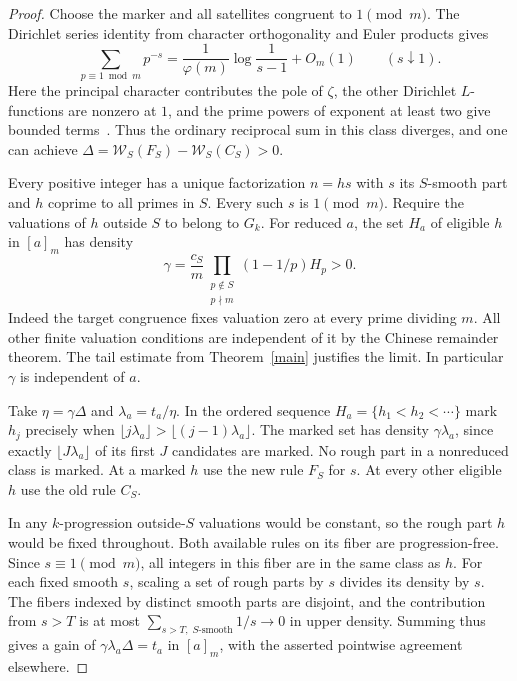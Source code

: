 \documentclass[11pt]{article}
\newcommand{\weight}{\mathcal W}
\begin{document}
\begin{proof}
Choose the marker and all satellites congruent to $1\pmod m$. The Dirichlet series identity from character orthogonality and Euler products gives
\[
 \sum_{p\equiv1\bmod m}p^{-s}
 =\frac1{\varphi(m)}\log\frac1{s-1}+O_m(1)
 \qquad(s\downarrow1).
\]
Here the principal character contributes the pole of $\zeta$, the other Dirichlet $L$-functions are nonzero at $1$, and the prime powers of exponent at least two give bounded terms~\cite{dirichlet}. Thus the ordinary reciprocal sum in this class diverges, and one can achieve $\Delta=\weight_S(F_S)-\weight_S(C_S)>0$.

Every positive integer has a unique factorization $n=hs$ with $s$ its $S$-smooth part and $h$ coprime to all primes in $S$. Every such $s$ is $1\pmod m$. Require the valuations of $h$ outside $S$ to belong to $G_k$. For reduced $a$, the set $H_a$ of eligible $h$ in $[a]_m$ has density
\[
       \gamma=\frac{c_S}{m}
          \prod_{\substack{p\notin S\\ p\nmid m}}(1-1/p)H_p>0.
\]
Indeed the target congruence fixes valuation zero at every prime dividing $m$. All other finite valuation conditions are independent of it by the Chinese remainder theorem. The tail estimate from Theorem~\ref{main} justifies the limit. In particular $\gamma$ is independent of $a$.

Take $\eta=\gamma\Delta$ and $\lambda_a=t_a/\eta$. In the ordered sequence $H_a=\{h_1<h_2<\cdots\}$ mark $h_j$ precisely when $\lfloor j\lambda_a\rfloor>\lfloor(j-1)\lambda_a\rfloor$. The marked set has density $\gamma\lambda_a$, since exactly $\lfloor J\lambda_a\rfloor$ of its first $J$ candidates are marked. No rough part in a nonreduced class is marked. At a marked $h$ use the new rule $F_S$ for $s$. At every other eligible $h$ use the old rule $C_S$.

In any $k$-progression outside-$S$ valuations would be constant, so the rough part $h$ would be fixed throughout. Both available rules on its fiber are progression-free. Since $s\equiv1\pmod m$, all integers in this fiber are in the same class as $h$. For each fixed smooth $s$, scaling a set of rough parts by $s$ divides its density by $s$. The fibers indexed by distinct smooth parts are disjoint, and the contribution from $s>T$ is at most $\sum_{s>T,\;S\text{-smooth}}1/s\to0$ in upper density. Summing thus gives a gain of $\gamma\lambda_a\Delta=t_a$ in $[a]_m$, with the asserted pointwise agreement elsewhere.
\end{proof}
\end{document}
